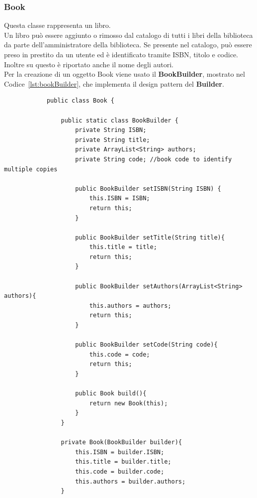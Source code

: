     \subsubsection{Book}
    Questa classe rappresenta un libro.\\
    Un libro può essere aggiunto o rimosso dal catalogo di tutti i libri della biblioteca da parte dell'amministratore della biblioteca. Se presente nel catalogo, può essere preso in prestito da un utente ed è identificato tramite ISBN, titolo e codice. Inoltre su questo è riportato anche il nome degli autori.\\
    Per la creazione di un oggetto Book viene usato il \textbf{BookBuilder}, mostrato nel Codice~\ref{lst:bookBuilder}, che implementa il design pattern del \textbf{Builder}.\\
    \begin{listing}[H]
        \begin{verbatim}
            public class Book {
            
                public static class BookBuilder {
                    private String ISBN;
                    private String title;
                    private ArrayList<String> authors;
                    private String code; //book code to identify multiple copies
            
                    public BookBuilder setISBN(String ISBN) {
                        this.ISBN = ISBN;
                        return this;
                    }
            
                    public BookBuilder setTitle(String title){
                        this.title = title;
                        return this;
                    }
            
                    public BookBuilder setAuthors(ArrayList<String> authors){
                        this.authors = authors;
                        return this;
                    }
            
                    public BookBuilder setCode(String code){
                        this.code = code;
                        return this;
                    }
            
                    public Book build(){
                        return new Book(this);
                    }
                }
            
                private Book(BookBuilder builder){
                    this.ISBN = builder.ISBN;
                    this.title = builder.title;
                    this.code = builder.code;
                    this.authors = builder.authors;
                }
            

\end{verbatim}
\end{listing}
